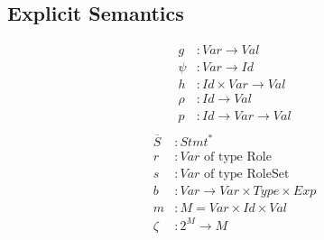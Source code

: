 \documentclass[acmsmall,review,anonymous]{acmart}\settopmatter{printfolios=true,printccs=false,printacmref=false}
\begin{document}
\vfill
\pagebreak

\subsection{Explicit Semantics}
\begin{align*}
  g &\colon Var \to Val \\
  \psi &\colon Var \to Id \\
  h &\colon Id \times Var \to Val \\
  \rho &\colon Id \to Val \\
  p &\colon Id \to Var \to Val \\
\end{align*}
\begin{align*}
  \overline{S} &\colon Stmt^\ast \\
  r &\colon Var \text{ of type Role} \\
  s &\colon Var \text{ of type RoleSet} \\
  b &\colon Var \to Var \times Type \times Exp \\
  m &\colon M = Var \times Id \times Val \\
  \zeta &\colon 2^M \to M
\end{align*}
\end{document}
